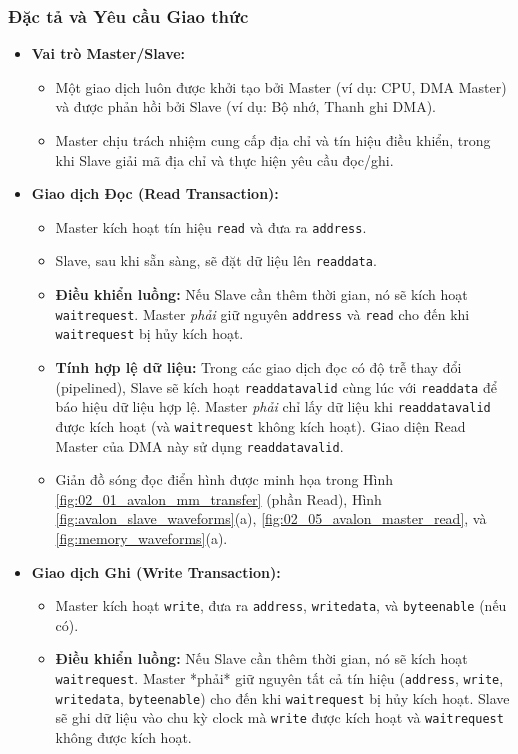 \subsubsection{Đặc tả và Yêu cầu Giao thức}
\begin{itemize}
    \item \textbf{Vai trò Master/Slave:} 
    \begin{itemize}
        \item Một giao dịch luôn được khởi tạo bởi Master (ví dụ: CPU, DMA Master) và được phản hồi bởi Slave (ví dụ: Bộ nhớ, Thanh ghi DMA).
        \item Master chịu trách nhiệm cung cấp địa chỉ và tín hiệu điều khiển, trong khi Slave giải mã địa chỉ và thực hiện yêu cầu đọc/ghi.
    \end{itemize} 
    \item \textbf{Giao dịch Đọc (Read Transaction):}
        \begin{itemize}
            \item Master kích hoạt tín hiệu \texttt{read} và đưa ra \texttt{address}.
            \item Slave, sau khi sẵn sàng, sẽ đặt dữ liệu lên \texttt{readdata}.
            \item \textbf{Điều khiển luồng:} Nếu Slave cần thêm thời gian, nó sẽ kích hoạt \texttt{waitrequest}. Master \textit{phải} giữ nguyên \texttt{address} và \texttt{read} cho đến khi \texttt{waitrequest} bị hủy kích hoạt.
            \item \textbf{Tính hợp lệ dữ liệu:} Trong các giao dịch đọc có độ trễ thay đổi (pipelined), Slave sẽ kích hoạt \texttt{readdatavalid} cùng lúc với \texttt{readdata} để báo hiệu dữ liệu hợp lệ. Master \textit{phải} chỉ lấy dữ liệu khi \texttt{readdatavalid} được kích hoạt (và \texttt{waitrequest} không kích hoạt). Giao diện Read Master của DMA này sử dụng \texttt{readdatavalid}.
            \item Giản đồ sóng đọc điển hình được minh họa trong Hình \ref{fig:02_01_avalon_mm_transfer} (phần Read), Hình \ref{fig:avalon_slave_waveforms}(a), \ref{fig:02_05_avalon_master_read}, và \ref{fig:memory_waveforms}(a).
        \end{itemize}
    \item \textbf{Giao dịch Ghi (Write Transaction):}
        \begin{itemize}
            \item Master kích hoạt \texttt{write}, đưa ra \texttt{address}, \texttt{writedata}, và \texttt{byteenable} (nếu có).
            \item \textbf{Điều khiển luồng:} Nếu Slave cần thêm thời gian, nó sẽ kích hoạt \texttt{waitrequest}. Master *phải* giữ nguyên tất cả tín hiệu (\texttt{address}, \texttt{write}, \texttt{writedata}, \texttt{byteenable}) cho đến khi \texttt{waitrequest} bị hủy kích hoạt. Slave sẽ ghi dữ liệu vào chu kỳ clock mà \texttt{write} được kích hoạt và \texttt{waitrequest} không được kích hoạt.

\end{itemize}
\end{itemize}
